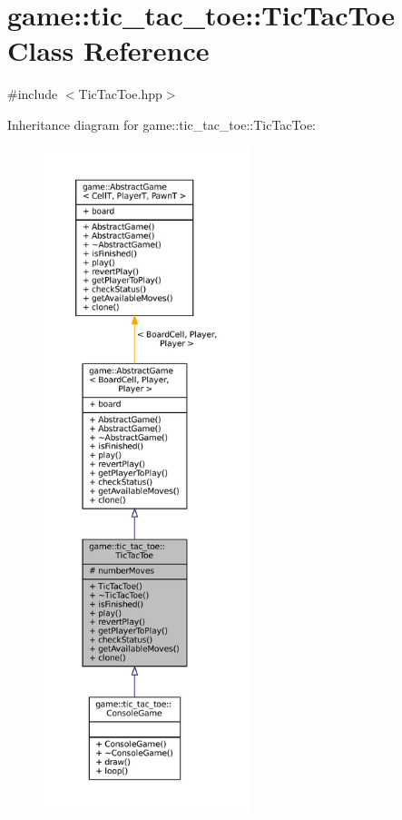 \hypertarget{classgame_1_1tic__tac__toe_1_1_tic_tac_toe}{}\section{game\+:\+:tic\+\_\+tac\+\_\+toe\+:\+:Tic\+Tac\+Toe Class Reference}
\label{classgame_1_1tic__tac__toe_1_1_tic_tac_toe}


{\ttfamily \#include $<$Tic\+Tac\+Toe.\+hpp$>$}



Inheritance diagram for game\+:\+:tic\+\_\+tac\+\_\+toe\+:\+:Tic\+Tac\+Toe\+:
\nopagebreak
\begin{figure}[H]
\begin{center}
\leavevmode
\includegraphics[height=550pt]{classgame_1_1tic__tac__toe_1_1_tic_tac_toe__inherit__graph}
\end{center}
\end{figure}


